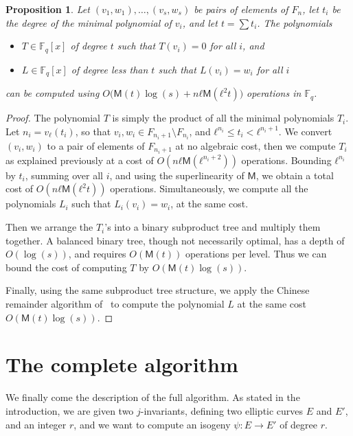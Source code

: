 \documentclass{lms}
\newtheorem{prop}[thm]{Proposition}
\def\cout#1{\mathsf{#1}}
\newcommand{\F}{\mathbb{F}}
\newcommand{\MM}{\cout{M}}
\begin{document}
\begin{prop}\label{prop:interpol}
  Let $(v_1,w_1),\dots,(v_s,w_s)$ be pairs of elements of $F_n$, let
  $t_i$ be the degree of the minimal polynomial of $v_i$, and let
  $t=\sum t_i$. The polynomials
  \begin{itemize}
  \item $T∈\F_q[x]$ of degree $t$ such that $T(v_i)=0$ for all $i$,
    and
  \item $L∈\F_q[x]$ of degree less than $t$ such that $L(v_i)=w_i$ for
    all $i$
  \end{itemize}
  can be computed using
  $O\bigl(\MM(t)\log(s) + nℓ\MM(ℓ^2t)\bigr)$ operations in $\F_q$.
\end{prop}
\begin{proof}
  The polynomial $T$ is simply the product of all the minimal
  polynomials $T_i$. Let $n_i=v_ℓ(t_i)$, so that
  $v_i,w_i∈F_{n_i+1}\setminus F_{n_i}$, and $ℓ^{n_i}≤t_i<ℓ^{n_i+1}$.
  We convert $(v_i,w_i)$ to a pair of elements of $F_{n_i+1}$ at no
  algebraic cost, then we compute $T_i$ as explained previously at a
  cost of $O(nℓ\MM(ℓ^{n_i+2}))$ operations. Bounding $ℓ^{n_i}$ by
  $t_i$, summing over all $i$, and using the superlinearity of $\MM$,
  we obtain a total cost of $O(nℓ\MM(ℓ^2t))$ operations.
  Simultaneously, we compute all the polynomials $L_i$ such that
  $L_i(v_i)=w_i$, at the same cost.

  Then we arrange the $T_i$'s into a binary subproduct tree and
  multiply them together. A balanced binary
  tree, though not necessarily optimal, has a depth of
  $O(\log (s))$, and requires $O(\MM(t))$ operations per level. Thus
  we can bound the cost of computing $T$ by $O(\MM(t)\log(s))$.

  Finally, using the same subproduct tree structure, we apply the
  Chinese remainder algorithm of~\cite[Chapter~10]{vzGG} to compute
  the polynomial $L$ at the same cost $O(\MM(t)\log(s))$.
\end{proof}


\section{The complete algorithm}
\label{sec:complete-algorithm}

We finally come the description of the full algorithm. As stated in
the introduction, we are given two $j$-invariants, defining two
elliptic curves $E$ and $E'$, and an integer $r$, and we want to
compute an isogeny $ψ:E→E'$ of degree $r$.
\end{document}
